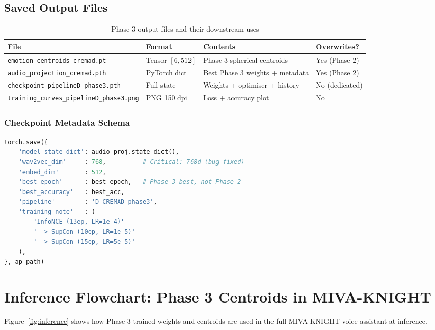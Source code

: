 \documentclass[12pt,a4paper]{article}
\theoremstyle{definition}
\theoremstyle{remark}
\begin{document}
\subsection{Saved Output Files}

\begin{table}[H]
\centering
\caption{Phase 3 output files and their downstream uses}
\begin{tabularx}{\textwidth}{llXl}
\toprule
File & Format & Contents & Overwrites? \\
\midrule
\texttt{emotion\_centroids\_cremad.pt} & Tensor $[6,512]$ & Phase 3 spherical centroids & Yes (Phase 2) \\
\texttt{audio\_projection\_cremad.pth} & PyTorch dict & Best Phase 3 weights + metadata & Yes (Phase 2) \\
\texttt{checkpoint\_pipelineD\_phase3.pth} & Full state & Weights + optimiser + history & No (dedicated) \\
\texttt{training\_curves\_pipelineD\_phase3.png} & PNG 150 dpi & Loss + accuracy plot & No \\
\bottomrule
\end{tabularx}
\end{table}

\subsubsection{Checkpoint Metadata Schema}

\begin{lstlisting}[language=Python, caption={Phase 3 audio projection save schema}]
torch.save({
    'model_state_dict': audio_proj.state_dict(),
    'wav2vec_dim'     : 768,          # Critical: 768d (bug-fixed)
    'embed_dim'       : 512,
    'best_epoch'      : best_epoch,   # Phase 3 best, not Phase 2
    'best_accuracy'   : best_acc,
    'pipeline'        : 'D-CREMAD-phase3',
    'training_note'   : (
        'InfoNCE (13ep, LR=1e-4)'
        ' -> SupCon (10ep, LR=1e-5)'
        ' -> SupCon (15ep, LR=5e-5)'
    ),
}, ap_path)
\end{lstlisting}

\section{Inference Flowchart: Phase 3 Centroids in MIVA-KNIGHT}

Figure~\ref{fig:inference} shows how Phase 3 trained weights and
centroids are used in the full MIVA-KNIGHT voice assistant at inference.
\end{document}
